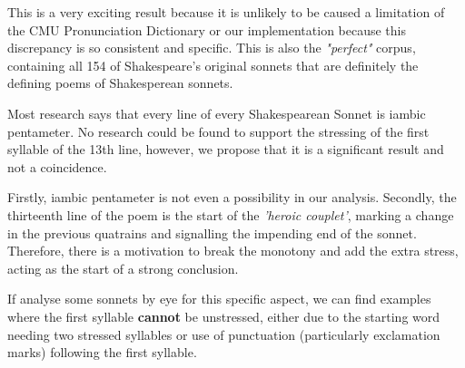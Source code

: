 \begin{description}
This is a very exciting result because it is unlikely to be caused a limitation of the CMU Pronunciation Dictionary or our implementation because this discrepancy is so consistent and specific. This is also the \textit{"perfect"} corpus, containing all 154 of Shakespeare's original sonnets that are definitely the defining poems of Shakesperean sonnets.

Most research says that every line of every Shakespearean Sonnet is iambic pentameter. No research could be found to support the stressing of the first syllable of the 13th line, however, we propose that it is a significant result and not a coincidence.

Firstly, iambic pentameter is not even a possibility in our analysis. Secondly, the thirteenth line of the poem is the start of the \textit{'heroic couplet'}, marking a change in the previous quatrains and signalling the impending end of the sonnet. Therefore, there is a motivation to break the monotony and add the extra stress, acting as the start of a strong conclusion.

If analyse some sonnets by eye for this specific aspect, we can find examples where the first syllable \textbf{cannot} be unstressed, either due to the starting word needing two stressed syllables or use of punctuation (particularly exclamation marks) following the first syllable.


\end{description}
